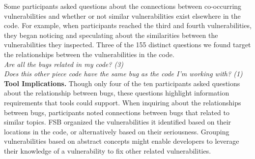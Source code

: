 \documentclass[conference]{IEEEtran}
\begin{document}
Some participants asked questions about the connections between co-occurring vulnerabilities and whether or not similar vulnerabilities exist elsewhere in the code. 
For example, when participants reached the third and fourth vulnerabilities, they began noticing and speculating about the similarities between the vulnerabilities they inspected.
Three of the 155 distinct questions we found target the relationships between the vulnerabilities in the code. 
\\

\noindent\emph{Are all the bugs related in my code? (3)} \\
\emph{Does this other piece code have the same bug as the code I'm working with? (1)} \\



\noindent\textbf{Tool Implications.}
Though only four of the ten participants asked questions about the relationship between bugs, these questions highlight information requirements that tools could support.
When inquiring about the relationships between bugs, participants noted connections between bugs that related to similar topics.
FSB organized the vulnerabilities it identified based on their locations in the code, or alternatively based on their seriousness.
Grouping vulnerabilities based on abstract concepts might enable developers to leverage their knowledge of a vulnerability to fix other related vulnerabilities.

\end{document}
